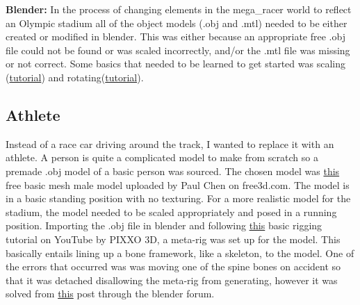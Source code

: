 \documentclass[a4 paper, 12pt]{article}
\begin{document}
\textbf{Blender:} In the process of changing elements in the mega\_racer world to reflect an Olympic stadium all of the object models (.obj and .mtl) needed to be either created or modified in blender. This was either because an appropriate free .obj file could not be found or was scaled incorrectly, and/or the .mtl file was missing or not correct. Some basics that needed to be learned to get started was scaling (\href{https://www.youtube.com/watch?v=FPp3ClfDYqI}{tutorial}) and rotating(\href{https://www.youtube.com/watch?v=NUy2O13QH68}{tutorial}).

\subsection{Athlete}
Instead of a race car driving around the track, I wanted to replace it with an athlete. A person is quite a complicated model to make from scratch so a premade .obj model of a basic person was sourced. The chosen model was \href{https://free3d.com/3d-model/male-base-mesh-6682.html}{this} free basic mesh male model uploaded by Paul Chen on free3d.com. The model is in a basic standing position with no texturing. For a more realistic model for the stadium, the model needed to be scaled appropriately and posed in a running position. Importing the .obj file in blender and following \href{https://www.youtube.com/watch?v=XHa2Y8zjtZQ}{this} basic rigging tutorial on YouTube by PIXXO 3D, a meta-rig was set up for the model. This basically entails lining up a bone framework, like a skeleton, to the model. One of the errors that occurred was was moving one of the spine bones on accident so that it was detached disallowing the meta-rig from generating, however it was solved from \href{https://blender.stackexchange.com/questions/169555/rigify-error-bone-cannot-connect-chain-bone}{this} post through the blender forum.
\end{document}
